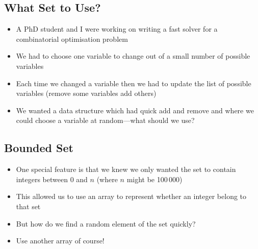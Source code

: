 
\begin{slide}
\section{What Set to Use?}

\begin{PauseHighLight}
  \begin{itemize}
  \item A PhD student and I were working on writing a fast solver for a
    combinatorial optimisation problem\pause
  \item We had to choose one variable to change out of a small number of
    possible variables\pause
  \item Each time we changed a variable then we had to update the list
    of possible variables (remove some variables add others)\pause
  \item We wanted a data structure which had quick add and remove and
    where we could choose a variable at random\pause---what should we
    use?\pauseb
  \end{itemize}
\end{PauseHighLight}

\end{slide}


\begin{slide}
\section{Bounded Set}

\begin{PauseHighLight}
  \begin{itemize}
  \item One special feature is that we knew we only wanted the set to
    contain integers between 0 and $n$ (where $n$ might be 100\,000)\pause
  \item This allowed us to use an array to represent whether an integer
    belong to that set\pause
  \item But how do we find a random element of the set quickly?\pause
  \item Use another array of course!\pauseb
  \end{itemize}
\end{PauseHighLight}

\end{slide}

